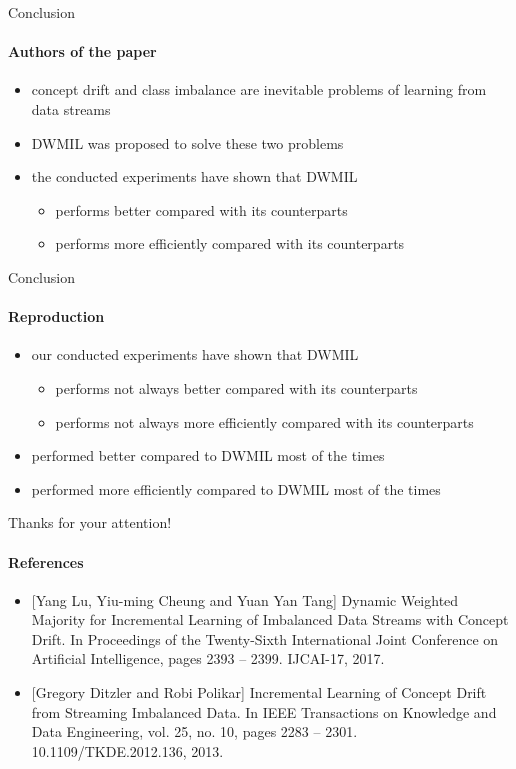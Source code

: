 
\begin{frame}{Conclusion}
\framesubtitle{Authors of the paper}

\begin{itemize}
    \item concept drift and class imbalance are inevitable problems of learning from data streams
    \item DWMIL was proposed to solve these two problems
    \item the conducted experiments have shown that DWMIL
    \begin{itemize}
        \item performs better compared with its counterparts
        \item performs more efficiently compared with its counterparts
    \end{itemize}
\end{itemize}

\end{frame}


\begin{frame}{Conclusion}
\framesubtitle{Reproduction}

\begin{itemize}
    \item our conducted experiments have shown that DWMIL
    \begin{itemize}
        \item performs not always better compared with its counterparts
        \item performs not always more efficiently compared with its counterparts
    \end{itemize}
    \item \lpn{} performed better compared to DWMIL most of the times
    \item \lpn{} performed more efficiently compared to DWMIL most of the times
\end{itemize}

\end{frame}


\begin{frame}{Thanks for your attention!}
\framesubtitle{References}

\begin{itemize}
    \item{} [Yang Lu, Yiu-ming Cheung and Yuan Yan Tang] Dynamic Weighted Majority for Incremental Learning of Imbalanced Data Streams with Concept Drift. In Proceedings of the Twenty-Sixth International Joint Conference on Artificial Intelligence, pages 2393 -- 2399. IJCAI-17, 2017.
    \item{} [Gregory Ditzler and Robi Polikar] Incremental Learning of Concept Drift from Streaming Imbalanced Data. In IEEE Transactions on Knowledge and Data Engineering, vol. 25, no. 10, pages 2283 -- 2301. 10.1109/TKDE.2012.136, 2013.
\end{itemize}

\end{frame}

